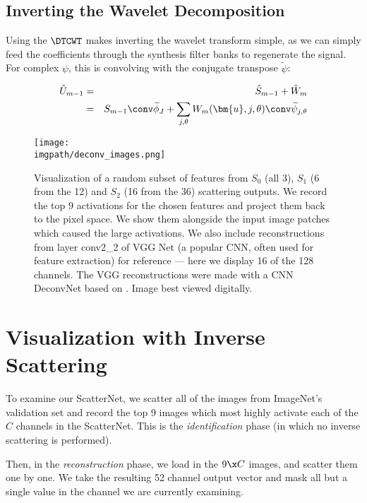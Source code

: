 \subsection{Inverting the Wavelet Decomposition}
Using the $\DTCWT$ makes inverting the wavelet transform simple, as we
can simply feed the coefficients through the synthesis filter banks to regenerate
the signal. For complex $\psi$, this is convolving with the conjugate transpose
$\widetilde{\psi}$: 

\begin{eqnarray}
  \label{eq:ch4:x_hat}
  \hat{U}_{m-1} &=& \hat{S}_{m-1} + \hat{W}_{m} \\
              &=& S_{m-1} \conv \widetilde{\phi}_J + \sum_{j, \theta} W_{m}(\bm{u}, j,
  \theta) \conv \widetilde{\psi}_{j, \theta}
\end{eqnarray}

\begin{figure}[tp]
  \centering
  \texttt{[image: \\imgpath/deconv\_images.png]}
  \caption{Visualization of a random subset of features from $S_0$ (all
  3), $S_1$ (6 from the 12) and $S_2$ (16 from the 36) scattering
    outputs. We record the top 9 activations for the chosen features and project
    them back to the pixel space. We show them alongside the input image patches
    which caused the large activations. We also include reconstructions from
    layer conv2\_2 of VGG Net \cite{simonyan_very_2014}(a popular CNN, often used
    for feature extraction) for reference --- here we display 16 of the 128
    channels. The VGG reconstructions were made with a CNN DeconvNet based on
    \cite{zeiler_visualizing_2014}. Image best viewed digitally.}
  \label{fig:ch4:reconstructions}
\end{figure}

\section{Visualization with Inverse Scattering}
\label{sec:ch4:visualization}

To examine our ScatterNet, we scatter all of the images from ImageNet's validation
set and record the top 9 images which most highly activate each of the $C$
channels in the ScatterNet. This is the \emph{identification} phase (in which no
inverse scattering is performed). 

Then, in the \emph{reconstruction}
phase, we load in the $9\x C$ images, and scatter them one by one. We take the
resulting 52 channel output vector and mask all but a single value in the
channel we are currently examining.

